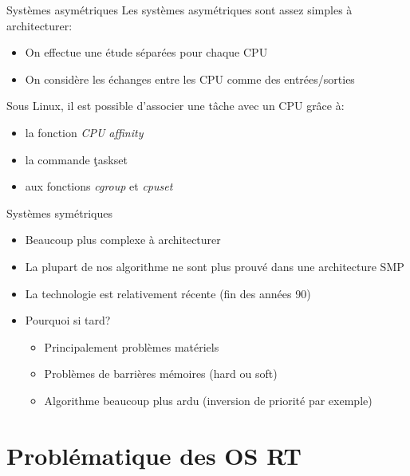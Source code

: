 \begin{frame}{Systèmes asymétriques}
  Les systèmes asymétriques sont assez simples à architecturer:
  \begin{itemize}
  \item On effectue une étude séparées pour chaque CPU
  \item   On  considère  les   échanges  entre   les  CPU   comme  des
    entrées/sorties
  \end{itemize}
  Sous Linux, il  est possible d'associer une tâche  avec un CPU grâce
  à:
  \begin{itemize}
  \item la fonction \emph{CPU affinity}
  \item la commande \c{taskset}
  \item aux fonctions \emph{cgroup} et \emph{cpuset}
  \end{itemize}
\end{frame}

\begin{frame}{Systèmes symétriques}
  \begin{itemize}
  \item Beaucoup plus complexe à architecturer
  \item  La plupart de  nos algorithme  ne sont  plus prouvé  dans une
    architecture SMP
  \item La technologie est relativement récente (fin des années 90)
  \item Pourquoi si tard?
    \begin{itemize}
    \item Principalement problèmes matériels
    \item Problèmes de barrières mémoires (hard ou soft)
    \item Algorithme  beaucoup plus  ardu (inversion de  priorité par
      exemple)
    \end{itemize}
  \end{itemize}
\end{frame}

\section{Problématique des OS RT} %

